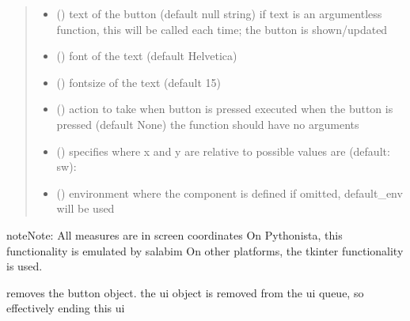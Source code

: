 \documentclass[letterpaper,10pt,english]{sphinxmanual}
\begin{document}
\begin{fulllineitems}
\begin{quote}
\begin{description}
\begin{itemize}
\item {} 
 () \textendash{} text of the button (default null string) 
if text is an argumentless function, this will be called each time;
the button is shown/updated

\item {} 
 () \textendash{} font of the text (default Helvetica)

\item {} 
 () \textendash{} fontsize of the text (default 15)

\item {} 
 () \textendash{} action to take when button is pressed 
executed when the button is pressed (default None)
the function should have no arguments 

\item {} 
 () \textendash{} specifies where x and y are relative to 
possible values are (default: sw): 

\item {} 
 ({\hyperref[\detokenize{Reference:salabim.Environment}]{}}) \textendash{} environment where the component is defined 
if omitted, default\_env will be used

\end{itemize}

\end{description}\end{quote}

\begin{sphinxadmonition}{note}{Note:}
All measures are in screen coordinates 
On Pythonista, this functionality is emulated by salabim
On other platforms, the tkinter functionality is used.
\end{sphinxadmonition}

\begin{fulllineitems}
\label{\detokenize{Reference:salabim.AnimateButton.remove}}
removes the button object. 
the ui object is removed from the ui queue,
so effectively ending this ui

\end{fulllineitems}


\end{fulllineitems}
\end{document}
